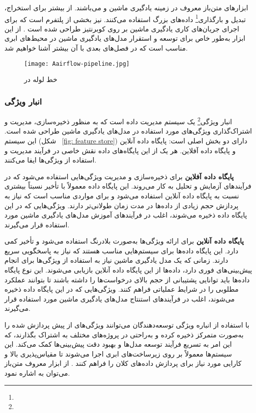 ابزارهای متن‌باز معروف در زمینه یادگیری ماشین \cite{Airflow} و  می‌باشند. از  بیشتر برای استخراج، تبدیل و بارگذاری\footnote{} داده‌های بزرگ استفاده می‌کنند.  نیز بخشی از پلتفرم \cite{Kubeflow} است که برای اجرای جریان‌های کاری یادگیری ماشین بر روی کوبرنتیز طراحی شده است \cite{MLOpsWFCOMP1}. از این ابزار به‌طور خاص برای توسعه و استقرار مدل‌های یادگیری ماشین در محیط‌های ابری مناسب است که در فصل‌های بعدی با آن بیشتر آشنا خواهیم شد.	

\begin{figure}[t]
	\centering
	\texttt{[image: Aairflow-pipeline.jpg]}
	\caption{خط لوله در }
	\label{fig: airflow pipelines}
\end{figure}

\subsubsection{انبار ویژگی}
انبار ویژگی\footnote{} یک سیستم مدیریت داده است که به منظور ذخیره‌سازی، مدیریت و اشتراک‌گذاری ویژگی‌های مورد استفاده در مدل‌های یادگیری ماشین طراحی شده است. این سیستم (شکل 
~\ref{fig: feature store})
دارای دو بخش اصلی است: پایگاه داده آنلاین و پایگاه داده آفلاین. هر یک از این پایگاه‌های داده نقش خاصی در فرآیند مدیریت و استفاده از ویژگی‌ها ایفا می‌کنند.

\textbf{پایگاه داده آفلاین}
برای ذخیره‌سازی و مدیریت ویژگی‌هایی استفاده می‌شود که در فرآیندهای آزمایش و تحلیل به کار می‌روند. این پایگاه داده معمولاً با تأخیر نسبتاً بیشتری نسبت به پایگاه داده آنلاین استفاده می‌شود و برای مواردی مناسب است که نیاز به پردازش حجم زیادی از داده‌ها در مدت زمان طولانی‌تر دارند. ویژگی‌هایی که در این پایگاه داده ذخیره می‌شوند، اغلب در فرآیندهای آموزش مدل‌های یادگیری ماشین مورد استفاده قرار می‌گیرند.

\textbf{پایگاه داده آنلاین}
برای ارائه ویژگی‌ها به‌صورت بلادرنگ استفاده می‌شود و تأخیر کمی دارد. این پایگاه داده‌ها برای سیستم‌هایی مناسب هستند که نیاز به پاسخگویی سریع دارند. زمانی که یک مدل یادگیری ماشین نیاز به استفاده از ویژگی‌ها برای انجام پیش‌بینی‌های فوری دارد، داده‌ها از این پایگاه داده آنلاین بازیابی می‌شوند. این نوع پایگاه داده‌ها باید توانایی پشتیبانی از حجم بالای درخواست‌ها را داشته باشند تا بتوانند عملکرد مطلوبی را در شرایط عملیاتی فراهم کنند. ویژگی‌هایی که در این پایگاه داده ذخیره می‌شوند، اغلب در فرآیندهای استنتاج مدل‌های یادگیری ماشین مورد استفاده قرار می‌گیرند.

با استفاده از انباره ویژگی توسعه‌دهندگان می‌توانند ویژگی‌های از پیش پردازش شده را به‌صورت متمرکز ذخیره کرده و به‌راحتی در پروژه‌های مختلف به اشتراک بگذارند، که این امر به تسریع فرآیند توسعه مدل‌ها و بهبود دقت پیش‌بینی‌ها کمک می‌کند. این سیستم‌ها معمولاً بر روی زیرساخت‌های ابری اجرا می‌شوند تا مقیاس‌پذیری بالا و کارایی مورد نیاز برای پردازش داده‌های کلان را فراهم کنند \cite{MLOpsCT2}. از ابزار معروف متن‌باز می‌توان به \cite{Feast} اشاره نمود.

